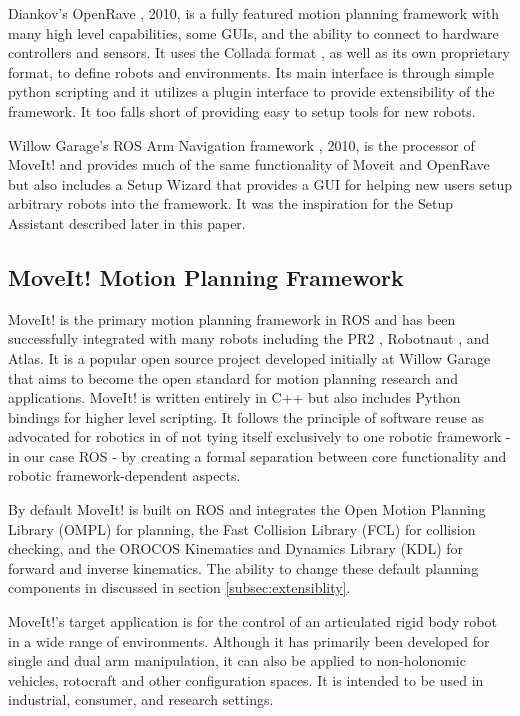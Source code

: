 \documentclass[10pt,journal,compsoc]{joser1}
\begin{document}
{Diankov's OpenRave  \cite{}, 2010, is a fully featured motion planning framework with many high level capabilities, some GUIs, and the ability to connect to hardware controllers and sensors. It uses the Collada format \cite{collada}, as well as its own proprietary format, to define robots and environments. Its main interface is through simple python scripting and it utilizes a plugin interface to provide extensibility of the framework. It too falls short of providing easy to setup tools for new robots. 

Willow Garage's ROS Arm Navigation framework \cite{}, 2010, is the processor of MoveIt! and provides much of the same functionality of Moveit and OpenRave but also includes a Setup Wizard that provides a GUI for helping new users setup arbitrary robots into the framework. It was the inspiration for the Setup Assistant described later in this paper.

\subsection{MoveIt! Motion Planning Framework}
\label{sec::moveit}

MoveIt! is the primary motion planning framework in ROS and has been successfully integrated with many robots including the PR2 \cite{wyrobek2008towards}, Robotnaut \cite{ambrose2000robonaut}, and Atlas. It is a popular open source project developed initially at Willow Garage that aims to become the open standard for motion planning research and applications. MoveIt! is written entirely in C++ but also includes Python bindings for higher level scripting. It follows the principle of software reuse as advocated for robotics in \cite{makarenko2007benefits} of not tying itself exclusively to one robotic framework - in our case ROS - by creating a formal separation between core functionality and robotic framework-dependent aspects. 

By default MoveIt! is built on ROS and integrates the Open Motion Planning Library (OMPL) \cite{sucan2012the-open-motion-planning-library} for planning, the Fast Collision Library (FCL) \cite{fcl} for collision checking, and the OROCOS Kinematics and Dynamics Library (KDL) \cite{kdl} for forward and inverse kinematics. The ability to change these default planning components in discussed in section \ref{subsec:extensiblity}.

MoveIt!'s target application is for the control of an articulated rigid body robot in a wide range of environments. Although it has primarily been developed for single and dual arm manipulation, it can also be applied to non-holonomic vehicles, rotocraft and other configuration spaces. It is intended to be used in industrial, consumer, and research settings.

}
\end{document}

